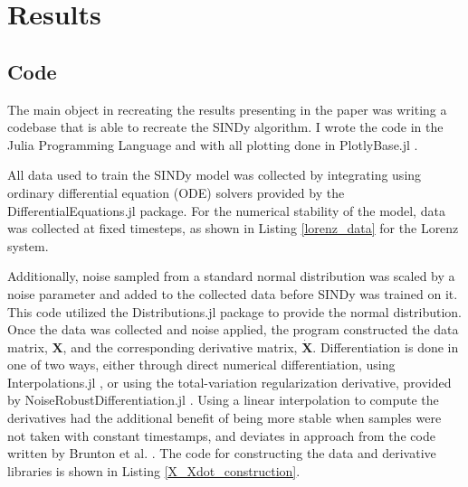 \documentclass[10pt]{paper}
\begin{document}
\section{Results} \label{sec:results}
\subsection{Code}
The main object in recreating the results presenting in the paper was writing a codebase that is able to recreate the SINDy algorithm. 
I wrote the code in the Julia Programming Language \cite{julia} and with all plotting done in PlotlyBase.jl \cite{PlotlyBase.jl}.

All data used to train the SINDy model was collected by integrating using ordinary differential equation (ODE) solvers provided by the DifferentialEquations.jl \cite{rackauckas2017differentialequations} package.
For the numerical stability of the model, data was collected at fixed timesteps, as shown in Listing \ref{lorenz_data} for the Lorenz system.


Additionally, noise sampled from a standard normal distribution was scaled by a noise parameter and added to the collected data before SINDy was trained on it. This code utilized the Distributions.jl \cite{JSSv098i16}\cite{Distributions.jl-2019} package to provide the normal distribution. 
Once the data was collected and noise applied, the program constructed the data matrix, $\mathbf X$, and the corresponding derivative matrix, $\mathbf {\dot X}$. Differentiation is done in one of two ways, either through direct numerical differentiation, using Interpolations.jl \cite{Interpolations.jl}, or using the total-variation regularization derivative, provided by NoiseRobustDifferentiation.jl \cite{chartrand2011numerical}\cite{NoiseRobustDifferentiation.jl}.
Using a linear interpolation to compute the derivatives had the additional benefit of being more stable when samples were not taken with constant timestamps, and deviates in approach from the code written by Brunton et al. \cite{sindy}. 
The code for constructing the data and derivative libraries is shown in Listing \ref{X_Xdot_construction}. 

\end{document}
